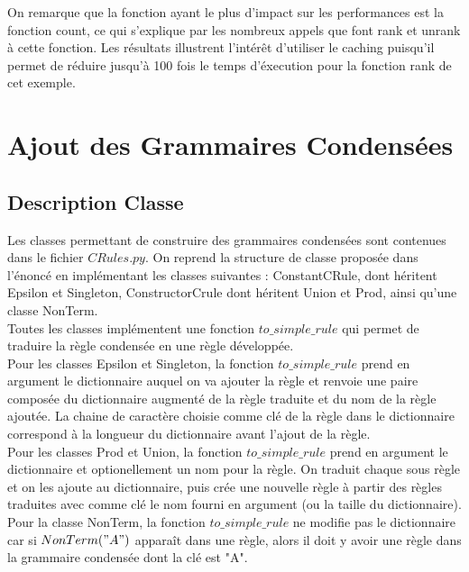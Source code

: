 \documentclass[a4paper, titlepage]{article}
\begin{document}
\begin{itemize}
On remarque que la fonction ayant le plus d'impact sur les
performances est la fonction count, ce qui s'explique par les
nombreux appels que font rank et unrank à cette fonction. Les
résultats illustrent l'intérêt d'utiliser le caching puisqu'il
permet de réduire jusqu'à 100 fois le temps d'éxecution pour la
fonction rank de cet exemple.

\section{Ajout des Grammaires Condensées}

\subsection{Description Classe}

Les classes permettant de construire des grammaires condensées sont
contenues dans le fichier $CRules.py$. On reprend la structure de
classe proposée dans l'énoncé en implémentant les classes suivantes :
ConstantCRule, dont héritent Epsilon et Singleton, ConstructorCrule
dont héritent Union et Prod, ainsi qu'une classe NonTerm.\\

Toutes les classes implémentent une fonction $to\_simple\_rule$ qui
permet de traduire la règle condensée en une règle développée. \\

Pour les classes Epsilon et Singleton, la fonction $to\_simple\_rule$
prend en argument le dictionnaire auquel on va ajouter la règle et
renvoie une paire composée du dictionnaire augmenté de la règle
traduite et du nom de la règle ajoutée. La chaine de caractère choisie
comme clé de la règle dans le dictionnaire correspond à la longueur du
dictionnaire avant l'ajout de la règle. \\

Pour les classes Prod et Union, la fonction $to\_simple\_rule$ prend
en argument le dictionnaire et optionellement un nom pour la règle.
On traduit chaque sous règle et on les ajoute au dictionnaire, puis
crée une nouvelle règle à partir des règles traduites avec comme clé
le nom fourni en argument (ou la taille du dictionnaire). \\

Pour la classe NonTerm, la fonction $to\_simple\_rule$ ne modifie pas
le dictionnaire car si $NonTerm("A")$ apparaît dans une règle, alors
il doit y avoir une règle dans la grammaire condensée dont la clé est
"A". \\


\end{itemize}
\end{document}
